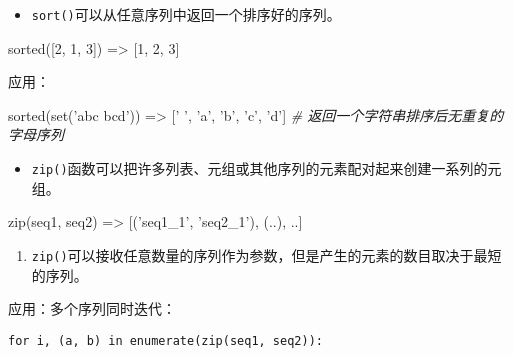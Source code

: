 \documentclass[]{article}
\newenvironment{Shaded}{}{}
\newcommand{\DecValTok}[1]{\textcolor[rgb]{0.25,0.63,0.44}{#1}}
\newcommand{\StringTok}[1]{\textcolor[rgb]{0.25,0.44,0.63}{#1}}
\newcommand{\CommentTok}[1]{\textcolor[rgb]{0.38,0.63,0.69}{\textit{#1}}}
\newcommand{\OperatorTok}[1]{\textcolor[rgb]{0.40,0.40,0.40}{#1}}
\newcommand{\BuiltInTok}[1]{#1}
\newcommand{\NormalTok}[1]{#1}
\begin{document}
\begin{itemize}
\item
  \texttt{sort()}可以从任意序列中返回一个排序好的序列。
\end{itemize}

\begin{Shaded}
\begin{Highlighting}[]
\BuiltInTok{sorted}\NormalTok{([}\DecValTok{2}\NormalTok{, }\DecValTok{1}\NormalTok{, }\DecValTok{3}\NormalTok{]) }\OperatorTok{=>}\NormalTok{ [}\DecValTok{1}\NormalTok{, }\DecValTok{2}\NormalTok{, }\DecValTok{3}\NormalTok{]}
\end{Highlighting}
\end{Shaded}

应用：

\begin{Shaded}
\begin{Highlighting}[]
\BuiltInTok{sorted}\NormalTok{(}\BuiltInTok{set}\NormalTok{(}\StringTok{'abc bcd'}\NormalTok{)) }\OperatorTok{=>}\NormalTok{ [}\StringTok{' '}\NormalTok{,}
\StringTok{'a'}\NormalTok{, }\StringTok{'b'}\NormalTok{, }\StringTok{'c'}\NormalTok{, }\StringTok{'d'}\NormalTok{]}
\CommentTok{# 返回一个字符串排序后无重复的字母序列}
\end{Highlighting}
\end{Shaded}

\begin{itemize}
\item
  \texttt{zip()}函数可以把许多列表、元组或其他序列的元素配对起来创建一系列的元组。
\end{itemize}

\begin{Shaded}
\begin{Highlighting}[]
\BuiltInTok{zip}\NormalTok{(seq1, seq2) }\OperatorTok{=>}\NormalTok{ [(}\StringTok{'seq1_1'}\NormalTok{, }\StringTok{'seq2_1'}\NormalTok{), (..), ..]}
\end{Highlighting}
\end{Shaded}

\begin{enumerate}
\def\labelenumi{\arabic{enumi}.}
\item
  \texttt{zip()}可以接收任意数量的序列作为参数，但是产生的元素的数目取决于最短的序列。
\end{enumerate}

应用：多个序列同时迭代：

\begin{verbatim}
for i, (a, b) in enumerate(zip(seq1, seq2)):
\end{verbatim}
\end{document}
